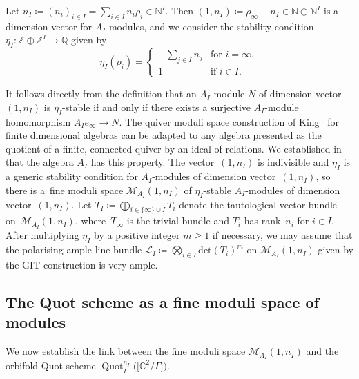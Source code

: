 \documentclass[pdftex]{sigma}%
\newcommand{\SC}{\mathbb{C}} %
\newcommand{\PiQ}{A}
\DeclareMathOperator{\Quot}{\mathrm{Quot}}
\newcommand{\QuotI}[1][ ]{\Quot_I^{#1}}
\newcommand{\QuotInI}{\QuotI[n_I]}
\numberwithin{equation}{section}
\begin{document}
Let
$n_I \coloneqq {(n_i)_{i\in I}}= \sum_{i \in I} n_i \rho_i \in \mathbb{N}^{I}$.
Then $(1,n_I)\coloneqq\rho_{\infty} +n_I \in \mathbb{N} \oplus \mathbb{N}^{I}$
is a dimension vector for $\PiQ_I$-modules, and we consider the stability condition $\eta_{I}\colon \mathbb{Z} \oplus \mathbb{Z}^{I} \to \mathbb{Q}$
given by
\begin{equation}
 \label{eqn:etaI}
\eta_I (\rho_i) =
\begin{cases}
\displaystyle -\sum_{j \in I} n_j & \textrm{for } i= \infty, \\
1 & \textrm{if }i \in I.
\end{cases}
\end{equation}

It follows directly from the definition that an $\PiQ_I$-module $N$ of dimension vector $(1,n_I)$ is $\eta_I$-stable if and only if
there exists a surjective $\PiQ_I$-module homomorphism $\PiQ_I e_{\infty} \to N$.
The quiver moduli space construction of King~\cite[Proposition~5.3]{king1994moduli} for finite dimensional algebras can be adapted to any algebra presented as the quotient of a finite, connected quiver by an ideal of relations. We established in \cite[Proposition~3.3]{craw2019punctual} that the algebra $\PiQ_I$ has this property.
The vector~$(1,n_I)$ is indivisible and $\eta_I$ is a generic stability condition for $\PiQ_I$-modules of dimension vector~$(1,n_I)$, so there is a~fine moduli space $\mathcal{M}_{\PiQ_I}(1,n_I)$
of $\eta_I$-stable $\PiQ_I$-modules of dimension
vector~$(1,n_I)$. Let $T_I \coloneqq\bigoplus_{i \in \{\infty \}\cup I } T_i$ denote the tautological vector bundle on~$\mathcal{M}_{\PiQ_I}(1,n_I)$, where~$T_{\infty}$ is the trivial bundle and $T_i$ has rank~$n_i$ for $i \in I$.
After multiplying $\eta_I$ by a positive integer $m\geq 1$ if necessary, we may assume that the polarising ample line bundle $\mathcal{L}_I \coloneqq \bigotimes_{i \in I} \mathrm{det}(T_i)^{m}$ on $\mathcal{M}_{\PiQ_I}(1,n_I)$ given by the GIT construction is very ample.

\subsection{The Quot scheme as a fine moduli space of modules}
We now establish the link between the fine moduli space $\mathcal{M}_{\PiQ_I}(1,n_I)$ and the orbifold Quot scheme $\QuotInI\big(\big[\SC^2/\Gamma\big]\big)$.
\end{document}
